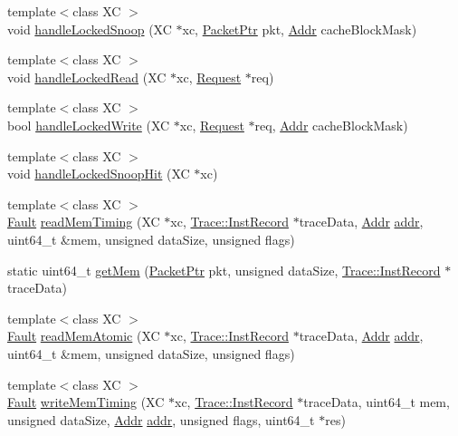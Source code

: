 \begin{DoxyCompactItemize}
\item 
{\footnotesize template$<$class XC $>$ }\\void \hyperlink{namespaceX86ISA_acda735ab07a398b2f35ba3812e5b389a}{handleLockedSnoop} (XC $\ast$xc, \hyperlink{classPacket}{PacketPtr} pkt, \hyperlink{base_2types_8hh_af1bb03d6a4ee096394a6749f0a169232}{Addr} cacheBlockMask)
\item 
{\footnotesize template$<$class XC $>$ }\\void \hyperlink{namespaceX86ISA_ae25812b653903deff64ba9ec77bbb621}{handleLockedRead} (XC $\ast$xc, \hyperlink{classRequest}{Request} $\ast$req)
\item 
{\footnotesize template$<$class XC $>$ }\\bool \hyperlink{namespaceX86ISA_a3a214e9047351ab4edcf64937e08de6d}{handleLockedWrite} (XC $\ast$xc, \hyperlink{classRequest}{Request} $\ast$req, \hyperlink{base_2types_8hh_af1bb03d6a4ee096394a6749f0a169232}{Addr} cacheBlockMask)
\item 
{\footnotesize template$<$class XC $>$ }\\void \hyperlink{namespaceX86ISA_ad398093a88ab6b5d6d11b250b3fe796f}{handleLockedSnoopHit} (XC $\ast$xc)
\item 
{\footnotesize template$<$class XC $>$ }\\\hyperlink{classRefCountingPtr}{Fault} \hyperlink{namespaceX86ISA_a6541d95ba049bea304004bc765578697}{readMemTiming} (XC $\ast$xc, \hyperlink{classTrace_1_1InstRecord}{Trace::InstRecord} $\ast$traceData, \hyperlink{base_2types_8hh_af1bb03d6a4ee096394a6749f0a169232}{Addr} \hyperlink{namespaceX86ISA_ab705917f60c5566f9ce56a93f798b2e2}{addr}, uint64\_\-t \&mem, unsigned dataSize, unsigned flags)
\item 
static uint64\_\-t \hyperlink{namespaceX86ISA_a71e49bc75208629f6958a8479a19bb22}{getMem} (\hyperlink{classPacket}{PacketPtr} pkt, unsigned dataSize, \hyperlink{classTrace_1_1InstRecord}{Trace::InstRecord} $\ast$traceData)
\item 
{\footnotesize template$<$class XC $>$ }\\\hyperlink{classRefCountingPtr}{Fault} \hyperlink{namespaceX86ISA_a3afb16e9fda02e17519871c8004ebdb9}{readMemAtomic} (XC $\ast$xc, \hyperlink{classTrace_1_1InstRecord}{Trace::InstRecord} $\ast$traceData, \hyperlink{base_2types_8hh_af1bb03d6a4ee096394a6749f0a169232}{Addr} \hyperlink{namespaceX86ISA_ab705917f60c5566f9ce56a93f798b2e2}{addr}, uint64\_\-t \&mem, unsigned dataSize, unsigned flags)
\item 
{\footnotesize template$<$class XC $>$ }\\\hyperlink{classRefCountingPtr}{Fault} \hyperlink{namespaceX86ISA_a758dc026bb35ddb9da038acfb4f8ac3a}{writeMemTiming} (XC $\ast$xc, \hyperlink{classTrace_1_1InstRecord}{Trace::InstRecord} $\ast$traceData, uint64\_\-t mem, unsigned dataSize, \hyperlink{base_2types_8hh_af1bb03d6a4ee096394a6749f0a169232}{Addr} \hyperlink{namespaceX86ISA_ab705917f60c5566f9ce56a93f798b2e2}{addr}, unsigned flags, uint64\_\-t $\ast$res)

\end{DoxyCompactItemize}

